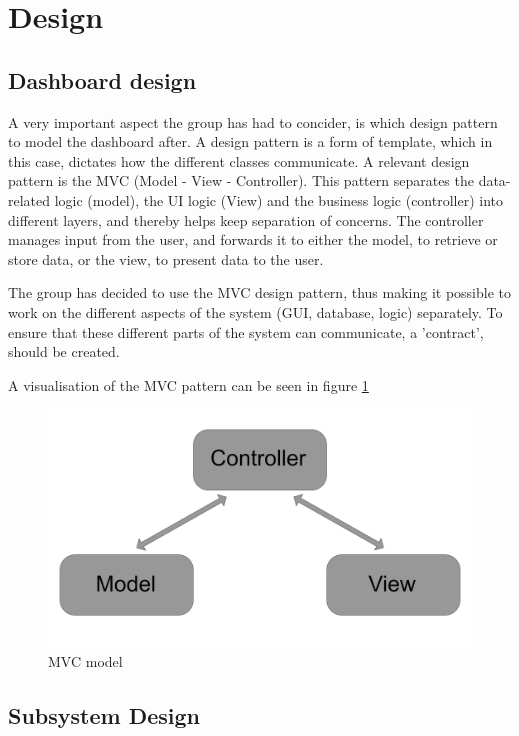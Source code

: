 \section{Design}

\subsection{Dashboard design}
A very important aspect the group has had to concider, is which design pattern
to model the dashboard after. A design pattern is a form of template, which in
this case, dictates how the different classes communicate. A relevant design
pattern is the MVC (Model - View - Controller). This pattern separates the
data-related logic (model), the UI logic (View) and the business logic 
(controller) into different layers, and thereby helps keep separation of
concerns. The controller manages input from the user, and forwards it to either
the model, to retrieve or store data, or the view, to present data to the user.

The group has decided to use the MVC design pattern, thus making it possible to
work on the different aspects of the system (GUI, database, logic) separately.
To ensure that these different parts of the system can communicate, a
'contract', should be created.

A visualisation of the MVC pattern can be seen in figure \ref{figure:MVC_model}

\begin{figure}[ht]
    \centering
    \includegraphics[scale=0.35]{images/MVC_model.jpg}
    \caption{MVC model}
    \label{figure:MVC_model}
\end{figure}

\subsection{Subsystem Design}
